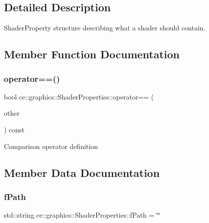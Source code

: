 \subsection{Detailed Description}
Shader\+Property structure describing what a shader should contain. 

\subsection{Member Function Documentation}
\mbox{\label{structce_1_1graphics_1_1_shader_properties_a36dd41572daba1bed598dee9fbc24cdb}} 
\subsubsection{\texorpdfstring{operator==()}{operator==()}}
{\footnotesize\ttfamily bool ce\+::graphics\+::\+Shader\+Properties\+::operator== (\begin{DoxyParamCaption}\item[{const \hyperlink{structce_1_1graphics_1_1_shader_properties}{Shader\+Properties} \&}]{other }\end{DoxyParamCaption}) const\hspace{0.3cm}{\ttfamily [inline]}}

Comparison operator definition 

\subsection{Member Data Documentation}
\mbox{\label{structce_1_1graphics_1_1_shader_properties_a38bb1cbff534647f4e2317e6b00ff14f}} 
\subsubsection{\texorpdfstring{f\+Path}{fPath}}
{\footnotesize\ttfamily std\+::string ce\+::graphics\+::\+Shader\+Properties\+::f\+Path = \char`\"{}\char`\"{}}

